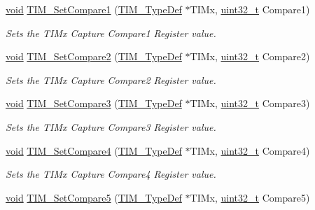 \begin{DoxyCompactItemize}
\hyperlink{group___n_a_m_e_ga18028b8badbf1ea7e704ccac3c488e82}{void} \hyperlink{group___t_i_m___group2_ga48631e66c32bb905946664f4722b2546}{T\-I\-M\-\_\-\-Set\-Compare1} (\hyperlink{struct_t_i_m___type_def}{T\-I\-M\-\_\-\-Type\-Def} $\ast$T\-I\-Mx, \hyperlink{stdint_8h_a435d1572bf3f880d55459d9805097f62}{uint32\-\_\-t} Compare1)
\begin{DoxyCompactList}\small\item\em Sets the T\-I\-Mx Capture Compare1 Register value. \end{DoxyCompactList}\item 
\hyperlink{group___n_a_m_e_ga18028b8badbf1ea7e704ccac3c488e82}{void} \hyperlink{group___t_i_m___group2_ga3de36754f3ba5d46b9ef2bf8e77575c7}{T\-I\-M\-\_\-\-Set\-Compare2} (\hyperlink{struct_t_i_m___type_def}{T\-I\-M\-\_\-\-Type\-Def} $\ast$T\-I\-Mx, \hyperlink{stdint_8h_a435d1572bf3f880d55459d9805097f62}{uint32\-\_\-t} Compare2)
\begin{DoxyCompactList}\small\item\em Sets the T\-I\-Mx Capture Compare2 Register value. \end{DoxyCompactList}\item 
\hyperlink{group___n_a_m_e_ga18028b8badbf1ea7e704ccac3c488e82}{void} \hyperlink{group___t_i_m___group2_gac372fbbbbc20329802659dd6c6b4e051}{T\-I\-M\-\_\-\-Set\-Compare3} (\hyperlink{struct_t_i_m___type_def}{T\-I\-M\-\_\-\-Type\-Def} $\ast$T\-I\-Mx, \hyperlink{stdint_8h_a435d1572bf3f880d55459d9805097f62}{uint32\-\_\-t} Compare3)
\begin{DoxyCompactList}\small\item\em Sets the T\-I\-Mx Capture Compare3 Register value. \end{DoxyCompactList}\item 
\hyperlink{group___n_a_m_e_ga18028b8badbf1ea7e704ccac3c488e82}{void} \hyperlink{group___t_i_m___group2_ga99ba6c2afa87a239c9d32a49762b4245}{T\-I\-M\-\_\-\-Set\-Compare4} (\hyperlink{struct_t_i_m___type_def}{T\-I\-M\-\_\-\-Type\-Def} $\ast$T\-I\-Mx, \hyperlink{stdint_8h_a435d1572bf3f880d55459d9805097f62}{uint32\-\_\-t} Compare4)
\begin{DoxyCompactList}\small\item\em Sets the T\-I\-Mx Capture Compare4 Register value. \end{DoxyCompactList}\item 
\hyperlink{group___n_a_m_e_ga18028b8badbf1ea7e704ccac3c488e82}{void} \hyperlink{group___t_i_m___group2_ga5a69681772274c0f5c9c7638dac8c4d6}{T\-I\-M\-\_\-\-Set\-Compare5} (\hyperlink{struct_t_i_m___type_def}{T\-I\-M\-\_\-\-Type\-Def} $\ast$T\-I\-Mx, \hyperlink{stdint_8h_a435d1572bf3f880d55459d9805097f62}{uint32\-\_\-t} Compare5)

\end{DoxyCompactItemize}
